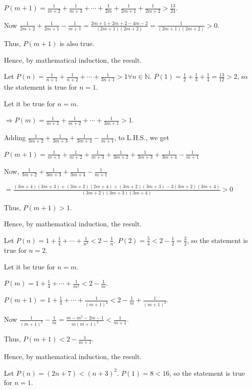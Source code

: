   $P(m + 1) = \frac{1}{m + 2}  + \frac{1}{m + 3} + \cdots + \frac{1}{2m} + \frac{1}{2m + 1} + \frac{1}{2m +
    2} > \frac{13}{24}$.

  Now $\frac{1}{2m + 2} + \frac{1}{2m + 1} - \frac{1}{m + 1} = \frac{2m + 1 + 2m + 2 - 4m - 2}{(2m + 1)(2m + 2)} =
  \frac{1}{(2m + 1)(2m + 2)} > 0$.

  Thus, $P(m + 1)$ is also true.

  Hence, by mathematical induction, the result.
\item Let $P(n) = \frac{1}{n + 1} + \frac{1}{n + 2} + \cdots + \frac{1}{3n + 1} > 1\forall
  n\in\mathbb{N}$. $P(1) = \frac{1}{2} + \frac{1}{3} + \frac{1}{4} = \frac{13}{12} > 2$, so the statement is
  true for $n = 1$.

  Let it be true for $n = m$.

  $\Rightarrow P(m) = \frac{1}{m + 1} + \frac{1}{m + 2} + \cdots + \frac{1}{3m + 1} > 1$.

  Adding $\frac{1}{3m + 2} + \frac{1}{3m + 3} + \frac{1}{3m + 4} - \frac{1}{m + 1}$, to L.H.S., we get

  $P(m + 1) = \frac{1}{m + 1} + \frac{1}{m + 2} + \frac{1}{m + 3} + \frac{1}{3m + 2} + \frac{1}{3m + 3} +
  \frac{1}{3m + 4} - \frac{1}{m + 1}$

  Now, $\frac{1}{3m + 2} + \frac{1}{3m + 3} + \frac{1}{3m + 4} - \frac{1}{m + 1}$

  $= \frac{(3m + 4)(3m + 3) +
    (3m + 2)(2m + 4) + (3m + 2)(3m + 3) - 3(3m + 2)(3m + 4)}{(3m + 2)(3m + 3)(3m + 4)} > 0$

  Thus, $P(m + 1) > 1$.

  Hence, by mathematical induction, the result.
\item Let $P(n) = 1 + \frac{1}{4} + \cdots + \frac{1}{n^2} < 2 - \frac{1}{n}$. $P(2) = \frac{5}{4} < 2 -
  \frac{1}{2} = \frac{3}{2}$, so the statement is true for $n = 2$.

  Let it be true for $n = m$.

  $P(m) = 1 + \frac{1}{4} + \cdots + \frac{1}{m^2} < 2 - \frac{1}{m}$.

  $P(m + 1) = 1 + \frac{1}{4} + \cdots + \frac{1}{(m + 1)^2} < 2 - \frac{1}{m} + \frac{1}{(m + 1)^2}$.

  Now $\frac{1}{(m + 1)^2} - \frac{1}{m} = \frac{m - m^2 - 2m - 1}{m(m + 1)^2} < \frac{1}{m + 1}$.

  Thus, $P(m + 1) < 2 - \frac{1}{m + 1}$.

  Hence, by mathematical induction, the result.
\item Let $P(n) = (2n + 7) < (n + 3)^2$. $P(1) = 8 < 16$, so the statement is true for $n = 1$.

